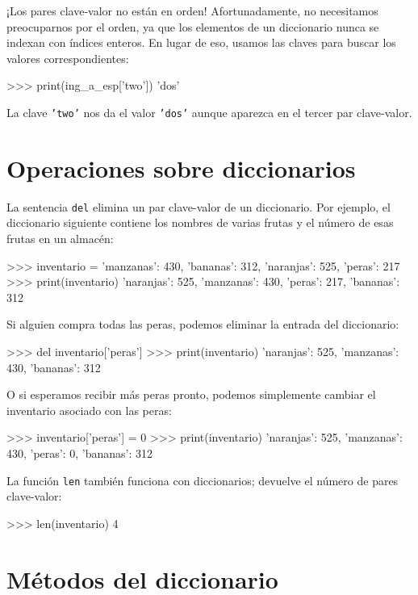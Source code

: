 ¡Los pares clave-valor no están en orden! Afortunadamente, no necesitamos
preocuparnos por el orden, ya que los elementos de un diccionario
nunca se indexan con índices enteros. En lugar de eso, usamos las
claves para buscar los valores correspondientes:
\begin{pyconcode}
>>> print(ing_a_esp['two'])
'dos'
\end{pyconcode}

La clave \texttt{'two'} nos da el valor \texttt{'dos'} aunque aparezca
en el tercer par clave-valor.

\section{Operaciones sobre diccionarios}

 

La sentencia \texttt{del} elimina un par clave-valor de un diccionario.
Por ejemplo, el diccionario siguiente contiene los nombres de varias
frutas y el número de esas frutas en un almacén:
\begin{pyconcode}
>>> inventario = {'manzanas': 430, 'bananas': 312, 
       'naranjas': 525,   'peras': 217}
>>> print(inventario)
{'naranjas': 525, 'manzanas': 430, 'peras': 217, 
 'bananas': 312}
\end{pyconcode}
 Si alguien compra todas las peras, podemos eliminar la entrada del
diccionario:
\begin{pyconcode}
>>> del inventario['peras']
>>> print(inventario)
{'naranjas': 525, 'manzanas': 430, 'bananas': 312}
\end{pyconcode}

O si esperamos recibir más peras pronto, podemos simplemente cambiar
el inventario asociado con las peras:
\begin{pyconcode}
>>> inventario['peras'] = 0
>>> print(inventario)
{'naranjas': 525, 'manzanas': 430, 'peras': 0, 
 'bananas': 312}
\end{pyconcode}
 La función \texttt{len} también funciona con diccionarios; devuelve
el número de pares clave-valor:
\begin{pyconcode}
>>> len(inventario)
4
\end{pyconcode}

\section{Métodos del diccionario}

